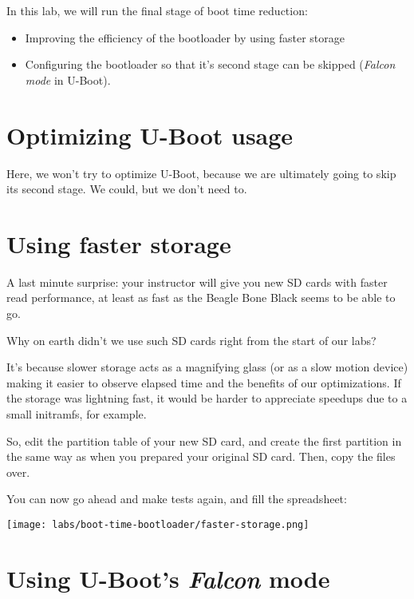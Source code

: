 
In this lab, we will run the final stage of boot time reduction:
\begin{itemize}
\item Improving the efficiency of the bootloader by using faster storage
\item Configuring the bootloader so that it's second stage can be
skipped ({\em Falcon mode} in U-Boot).
\end{itemize}

\section{Optimizing U-Boot usage}

Here, we won't try to optimize U-Boot, because we are ultimately
going to skip its second stage. We could, but we don't need to.

\section{Using faster storage}

A last minute surprise: your instructor will give you new SD cards with
faster read performance, at least as fast as the Beagle Bone Black seems
to be able to go.

Why on earth didn't we use such SD cards right from the start of our
labs?

It's because slower storage acts as a magnifying glass (or as a slow
motion device) making it easier to observe elapsed time and the benefits
of our optimizations. If the storage was lightning fast, it would be
harder to appreciate speedups due to a small initramfs, for example.

So, edit the partition table of your new SD card, and create the
first partition in the same way as when you prepared your original SD
card. Then, copy the files over.

You can now go ahead and make tests again, and fill the
 spreadsheet:
    
\texttt{[image: labs/boot-time-bootloader/faster-storage.png]}

\section{Using U-Boot's {\em Falcon} mode}

